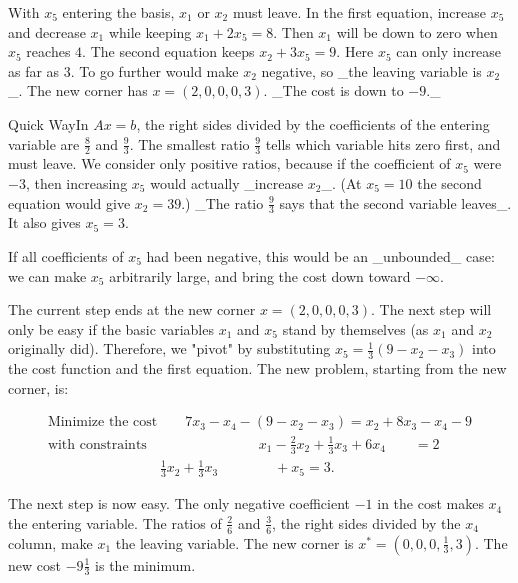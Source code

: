 With \(x_{5}\) entering the basis, \(x_{1}\) or \(x_{2}\) must leave. In the first equation, increase \(x_{5}\) and decrease \(x_{1}\) while keeping \(x_{1}+2x_{5}=8\). Then \(x_{1}\) will be down to zero when \(x_{5}\) reaches \(4\). The second equation keeps \(x_{2}+3x_{5}=9\). Here \(x_{5}\) can only increase as far as \(3\). To go further would make \(x_{2}\) negative, so _the leaving variable is \(x_{2}\)_. The new corner has \(x=(2,0,0,0,3)\). _The cost is down to \(-9\)._

Quick WayIn \(Ax=b\), the right sides divided by the coefficients of the entering variable are \(\frac{8}{2}\) and \(\frac{9}{3}\). The smallest ratio \(\frac{9}{3}\) tells which variable hits zero first, and must leave. We consider only positive ratios, because if the coefficient of \(x_{5}\) were \(-3\), then increasing \(x_{5}\) would actually _increase \(x_{2}\)_. (At \(x_{5}=10\) the second equation would give \(x_{2}=39\).) _The ratio \(\frac{9}{3}\) says that the second variable leaves_. It also gives \(x_{5}=3\).

If all coefficients of \(x_{5}\) had been negative, this would be an _unbounded_ case: we can make \(x_{5}\) arbitrarily large, and bring the cost down toward \(-\infty\).

The current step ends at the new corner \(x=(2,0,0,0,3)\). The next step will only be easy if the basic variables \(x_{1}\) and \(x_{5}\) stand by themselves (as \(x_{1}\) and \(x_{2}\) originally did). Therefore, we "pivot" by substituting \(x_{5}=\frac{1}{3}(9-x_{2}-x_{3})\) into the cost function and the first equation. The new problem, starting from the new corner, is:

\[\begin{array}{c}\mbox{Minimize the cost}\qquad 7x_{3}-x_{4}-(9-x_{2}-x_{3})=x_{2}+8x_{3}-x_{4 }-9\\ \mbox{with constraints}\qquad\qquad\qquad\qquad x_{1}-\frac{2}{3}x_{2}+\frac{1}{3}x_{ 3}+6x_{4}\qquad=2\\ \qquad\qquad\qquad\qquad\frac{1}{3}x_{2}+\frac{1}{3}x_{3}\qquad\qquad+x_{5}=3. \end{array}\]

The next step is now easy. The only negative coefficient \(-1\) in the cost makes \(x_{4}\) the entering variable. The ratios of \(\frac{2}{6}\) and \(\frac{3}{6}\), the right sides divided by the \(x_{4}\) column, make \(x_{1}\) the leaving variable. The new corner is \(x^{*}=(0,0,0,\frac{1}{3},3)\). The new cost \(-9\frac{1}{3}\) is the minimum.

